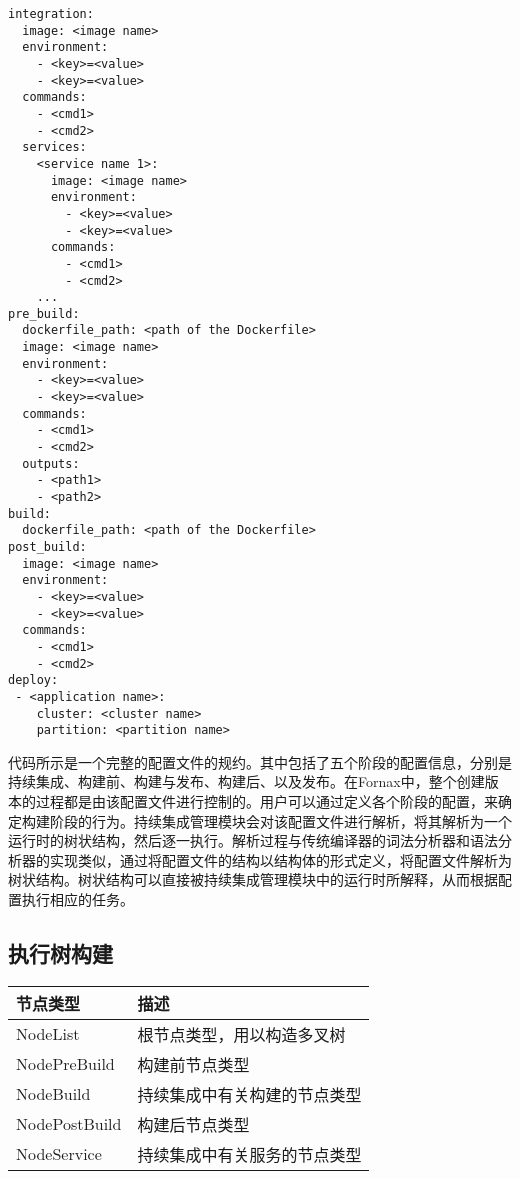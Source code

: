 \begin{lstlisting}[caption={配置文件格式}]
integration:
  image: <image name>
  environment:
    - <key>=<value>
    - <key>=<value>
  commands:
    - <cmd1>
    - <cmd2>
  services:
    <service name 1>:
      image: <image name>
      environment:
        - <key>=<value>
        - <key>=<value>
      commands:
        - <cmd1>
        - <cmd2>
    ...
pre_build:
  dockerfile_path: <path of the Dockerfile>
  image: <image name>
  environment:
    - <key>=<value>
    - <key>=<value>
  commands:
    - <cmd1>
    - <cmd2>
  outputs:
    - <path1>
    - <path2>
build:
  dockerfile_path: <path of the Dockerfile>
post_build:
  image: <image name>
  environment:
    - <key>=<value>
    - <key>=<value>
  commands:
    - <cmd1>
    - <cmd2>
deploy:
 - <application name>:
    cluster: <cluster name>
    partition: <partition name>
\end{lstlisting}

代码所示是一个完整的配置文件的规约。其中包括了五个阶段的配置信息，分别是持续集成、构建前、构建与发布、构建后、以及发布。在Fornax中，整个创建版本的过程都是由该配置文件进行控制的。用户可以通过定义各个阶段的配置，来确定构建阶段的行为。持续集成管理模块会对该配置文件进行解析，将其解析为一个运行时的树状结构，然后逐一执行。解析过程与传统编译器的词法分析器和语法分析器的实现类似，通过将配置文件的结构以结构体的形式定义，将配置文件解析为树状结构。树状结构可以直接被持续集成管理模块中的运行时所解释，从而根据配置执行相应的任务。

\subsection{执行树构建}

\begin{table}[!hpb]
  \centering
  \begin{tabular}{ll} \toprule
    节点类型 & 描述 \\ \midrule
    NodeList & 根节点类型，用以构造多叉树 \\
    NodePreBuild & 构建前节点类型  \\
    NodeBuild & 持续集成中有关构建的节点类型  \\
    NodePostBuild & 构建后节点类型 \\
    NodeService & 持续集成中有关服务的节点类型  \\ \bottomrule
  \end{tabular}
\end{table}

